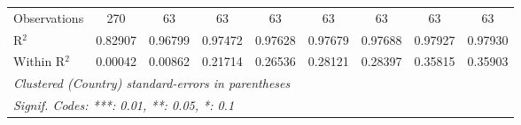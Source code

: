 \begin{table}[htbp]
\begin{tabular}{lcccccccc}
      Observations                                                           & 270      & 63       & 63              & 63              & 63              & 63              & 63              & 63\\  
      R$^2$                                                                  & 0.82907  & 0.96799  & 0.97472         & 0.97628         & 0.97679         & 0.97688         & 0.97927         & 0.97930\\  
      Within R$^2$                                                           & 0.00042  & 0.00862  & 0.21714         & 0.26536         & 0.28121         & 0.28397         & 0.35815         & 0.35903\\  
      \midrule \midrule
      \multicolumn{9}{l}{\emph{Clustered (Country) standard-errors in parentheses}}\\
      \multicolumn{9}{l}{\emph{Signif. Codes: ***: 0.01, **: 0.05, *: 0.1}}\\
   \end{tabular}
\end{table}


